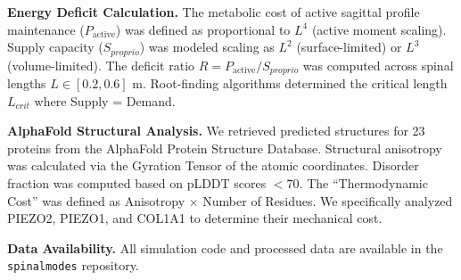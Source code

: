 \documentclass[11pt]{article}
\begin{document}
\textbf{Energy Deficit Calculation.} The metabolic cost of active sagittal profile maintenance ($P_{\mathrm{active}}$) was defined as proportional to $L^4$ (active moment scaling). Supply capacity ($S_{proprio}$) was modeled scaling as $L^2$ (surface-limited) or $L^3$ (volume-limited). The deficit ratio $R = P_{\mathrm{active}} / S_{proprio}$ was computed across spinal lengths $L \in [0.2, 0.6]$ m. Root-finding algorithms determined the critical length $L_{crit}$ where Supply = Demand.

\textbf{AlphaFold Structural Analysis.} We retrieved predicted structures for 23 proteins from the AlphaFold Protein Structure Database\cite{jumper2021alphafold}. Structural anisotropy was calculated via the Gyration Tensor of the atomic coordinates. Disorder fraction was computed based on pLDDT scores $< 70$. The ``Thermodynamic Cost'' was defined as Anisotropy $\times$ Number of Residues. We specifically analyzed PIEZO2, PIEZO1, and COL1A1 to determine their mechanical cost.

\textbf{Data Availability.} All simulation code and processed data are available in the \texttt{spinalmodes} repository.





\end{document}
